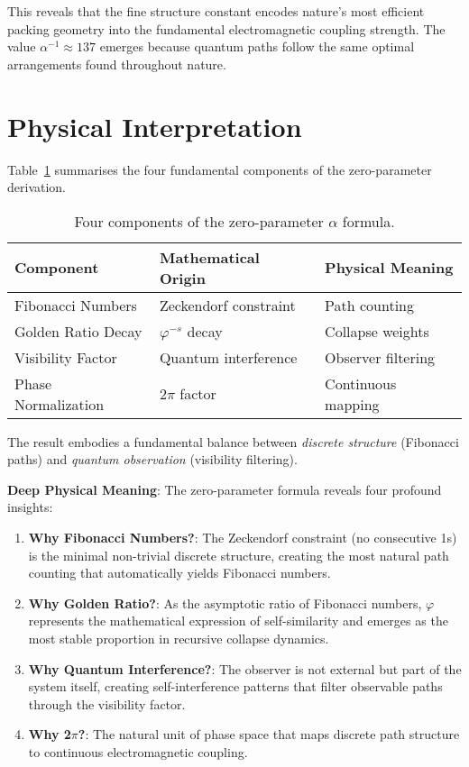 \documentclass[%
 reprint,
 amsmath,amssymb,
 aps,
 prd,
 10pt,
 nofootinbib,      %
 longbibliography  %
]{revtex4-2}
\theoremstyle{definition}
\theoremstyle{remark}
\begin{document}
This reveals that the fine structure constant encodes nature's most efficient packing geometry into the fundamental electromagnetic coupling strength. The value $\alpha^{-1} \approx 137$ emerges because quantum paths follow the same optimal arrangements found throughout nature.

\section{Physical Interpretation}\label{sec:interpretation}

Table~\ref{tab:contributions}
summarises the four fundamental components of the zero-parameter derivation.
\begin{table}[h!]
  \centering
  \small
  \begin{tabular}{@{}lll@{}}
    \toprule
    Component & Mathematical Origin & Physical Meaning \\
    \midrule
    Fibonacci Numbers & Zeckendorf constraint & Path counting \\
    Golden Ratio Decay & $\varphi^{-s}$ decay & Collapse weights \\
    Visibility Factor & Quantum interference & Observer filtering \\
    Phase Normalization & $2\pi$ factor & Continuous mapping \\
    \bottomrule
  \end{tabular}
  \caption{Four components of the zero-parameter $\alpha$ formula.}
  \label{tab:contributions}
\end{table}

The result embodies a fundamental balance between
\emph{discrete structure} (Fibonacci paths) and
\emph{quantum observation} (visibility filtering).

\textbf{Deep Physical Meaning}: The zero-parameter formula reveals four profound insights:

\begin{enumerate}
\item \textbf{Why Fibonacci Numbers?}: The Zeckendorf constraint (no consecutive 1s) is the minimal non-trivial discrete structure, creating the most natural path counting that automatically yields Fibonacci numbers.

\item \textbf{Why Golden Ratio?}: As the asymptotic ratio of Fibonacci numbers, $\varphi$ represents the mathematical expression of self-similarity and emerges as the most stable proportion in recursive collapse dynamics.

\item \textbf{Why Quantum Interference?}: The observer is not external but part of the system itself, creating self-interference patterns that filter observable paths through the visibility factor.

\item \textbf{Why 2$\pi$?}: The natural unit of phase space that maps discrete path structure to continuous electromagnetic coupling.
\end{enumerate}
\end{document}
